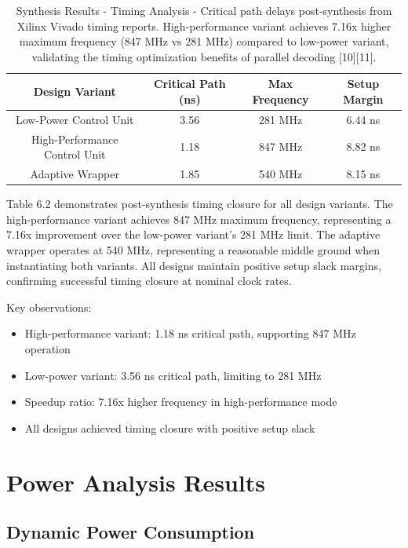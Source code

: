 \documentclass[15pt,a4paper]{report}
\begin{document}
\begin{table}[H]
    \centering
    \begin{tabular}{|c|c|c|c|}
        \hline
        \textbf{Design Variant} & \textbf{Critical Path (ns)} & \textbf{Max Frequency} & \textbf{Setup Margin} \\
        \hline
        Low-Power Control Unit & 3.56 & 281 MHz & 6.44 ns \\
        \hline
        High-Performance Control Unit & 1.18 & 847 MHz & 8.82 ns \\
        \hline
        Adaptive Wrapper & 1.85 & 540 MHz & 8.15 ns \\
        \hline
    \end{tabular}
    \label{tab:timing_synthesis}
    \caption{Synthesis Results - Timing Analysis - Critical path delays post-synthesis from Xilinx Vivado timing reports. High-performance variant achieves 7.16x higher maximum frequency (847 MHz vs 281 MHz) compared to low-power variant, validating the timing optimization benefits of parallel decoding [10][11].}
\end{table}

Table 6.2 demonstrates post-synthesis timing closure for all design variants. The high-performance variant achieves 847 MHz maximum frequency, representing a 7.16x improvement over the low-power variant's 281 MHz limit. The adaptive wrapper operates at 540 MHz, representing a reasonable middle ground when instantiating both variants. All designs maintain positive setup slack margins, confirming successful timing closure at nominal clock rates.

Key observations:
\begin{itemize}
    \item High-performance variant: 1.18 ns critical path, supporting 847 MHz operation
    \item Low-power variant: 3.56 ns critical path, limiting to 281 MHz
    \item Speedup ratio: 7.16x higher frequency in high-performance mode
    \item All designs achieved timing closure with positive setup slack
\end{itemize}

\section{Power Analysis Results}

\subsection{Dynamic Power Consumption}
\end{document}
